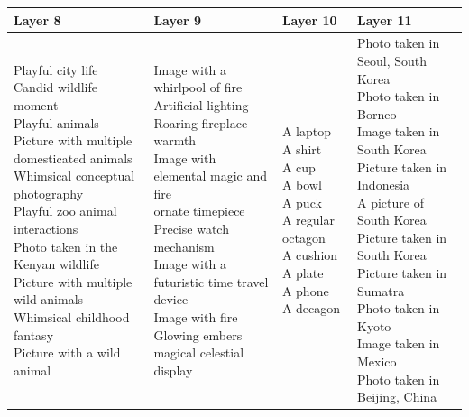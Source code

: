 \documentclass{article}
\begin{document}
\begin{table}[htbp]
\centering
\renewcommand{\arraystretch}{1.5}
\begin{tabular}{|p{4.0cm}|p{4.0cm}|p{4.0cm}|p{4.0cm}|}
\hline
\textbf{Layer 8} & \textbf{Layer 9} & \textbf{Layer 10} & \textbf{Layer 11} \\
\hline
\makecell[t]{Playful city life \\ Candid wildlife moment \\ Playful animals \\ Picture with multiple domesticated animals \\ Whimsical conceptual photography \\ Playful zoo animal interactions \\ Photo taken in the Kenyan wildlife \\ Picture with multiple wild animals \\ Whimsical childhood fantasy \\ Picture with a wild animal} & \makecell[t]{Image with a whirlpool of fire \\ Artificial lighting \\ Roaring fireplace warmth \\ Image with elemental magic and fire \\ ornate timepiece \\ Precise watch mechanism \\ Image with a futuristic time travel device \\ Image with fire \\ Glowing embers \\ magical celestial display} & \makecell[t]{A laptop \\ A shirt \\ A cup \\ A bowl \\ A puck \\ A regular octagon \\ A cushion \\ A plate \\ A phone \\ A decagon} & \makecell[t]{Photo taken in Seoul, South Korea \\ Photo taken in Borneo \\ Image taken in South Korea \\ Picture taken in Indonesia \\ A picture of South Korea \\ Picture taken in South Korea \\ Picture taken in Sumatra \\ Photo taken in Kyoto \\ Image taken in Mexico \\ Photo taken in Beijing, China} \\

\end{tabular}
\end{table}
\end{document}
